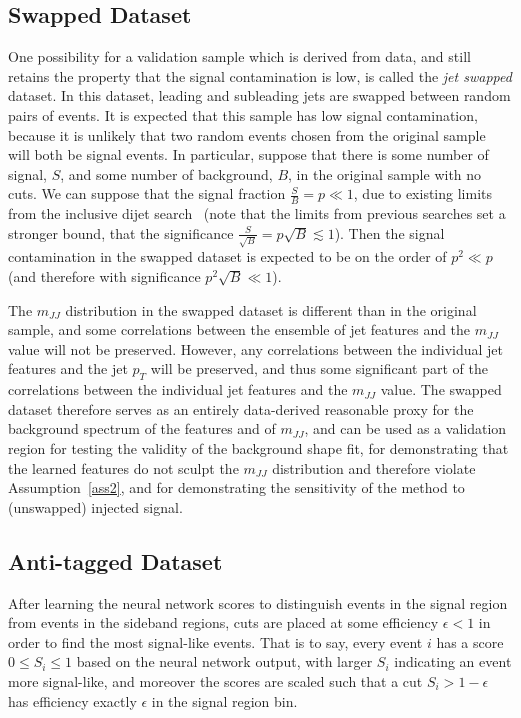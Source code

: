 \subsection{Swapped Dataset}
One possibility for a validation sample which is derived from data, and still retains the property that the signal contamination is low, is called the \textit{jet swapped} dataset.
In this dataset, leading and subleading jets are swapped between random pairs of events.
It is expected that this sample has low signal contamination, because it is unlikely that two random events chosen from the original sample will both be signal events.
In particular, suppose that there is some number of signal, $S$, and some number of background, $B$, in the original sample with no cuts.
We can suppose that the signal fraction $\frac{S}{B} = p\ll1$, due to existing limits from the inclusive dijet search~\cite{Aad:2019hjw} (note that the limits from previous searches set a stronger bound, that the significance $\frac{S}{\sqrt{B}}=p\sqrt{B} \lesssim 1$).
Then the signal contamination in the swapped dataset is expected to be on the order of $p^2 \ll p$ (and therefore with significance $p^2\sqrt{B} \ll 1$).

The $m_{JJ}$ distribution in the swapped dataset is different than in the original sample, and some correlations between the ensemble of jet features and the $m_{JJ}$ value will not be preserved.
However, any correlations between the individual jet features and the jet $p_T$ will be preserved, and thus some significant part of the correlations between the individual jet features and the $m_{JJ}$ value.
The swapped dataset therefore serves as an entirely data-derived reasonable proxy for the background spectrum of the features and of $m_{JJ}$, and can be used as a validation region for testing the validity of the background shape fit, for demonstrating that the learned features do not sculpt the $m_{JJ}$ distribution and therefore violate Assumption~\ref{ass2}, and for demonstrating the sensitivity of the method to (unswapped) injected signal.

\subsection{Anti-tagged Dataset}
After learning the neural network scores to distinguish events in the signal region from events in the sideband regions, cuts are placed at some efficiency $\epsilon < 1$ in order to find the most signal-like events.
That is to say, every event $i$ has a score $0\le S_i \le 1$ based on the neural network output, with larger $S_i$ indicating an event more signal-like, and moreover the scores are scaled such that a cut $S_i>1-\epsilon$ has efficiency exactly $\epsilon$ in the signal region bin.

